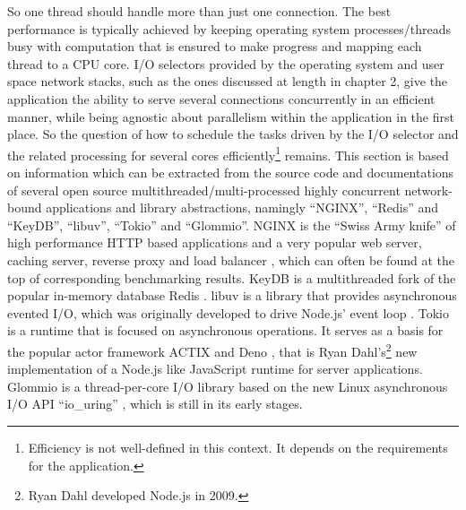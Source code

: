 So one thread should handle more than just one connection. The best performance is typically achieved by keeping operating system processes/threads busy with computation that is ensured to make progress and mapping each thread to a CPU core. I/O selectors provided by the operating system and user space network stacks, such as the ones discussed at length in chapter 2, give the application the ability to serve several connections concurrently in an efficient manner, while being agnostic about parallelism within the application in the first place. So the question of how to schedule the tasks driven by the I/O selector and the related processing for several cores efficiently\footnote{Efficiency is not well-defined in this context. It depends on the requirements for the application.} remains.\newline
This section is based on information which can be extracted from the source code and documentations of several open source multithreaded/multi-processed highly concurrent network-bound applications and library abstractions, namingly “NGINX”, “Redis” and “KeyDB”, “libuv”, “Tokio” and “Glommio”. \newline
NGINX is the “Swiss Army knife” of high performance HTTP based applications and a very popular web server, caching server, reverse proxy and load balancer \cite{soft:nginx}, which can often be found at the top of corresponding benchmarking results. KeyDB is a multithreaded fork of the popular in-memory database Redis \cite{soft:keydb}. libuv is a library that provides asynchronous evented I/O, which was originally developed to drive Node.js’ event loop \cite{soft:libuv}. Tokio is a runtime that is focused on asynchronous operations. It serves as a basis for the popular actor framework ACTIX \cite{soft:actix} and Deno \cite{soft:deno}, that is Ryan Dahl’s\footnote{Ryan Dahl developed Node.js in 2009.} new implementation of a Node.js like JavaScript runtime for server applications. Glommio is a thread-per-core I/O library based on the new Linux asynchronous I/O API “io\_uring” \cite{soft:glommio}, which is still in its early stages. \newline
